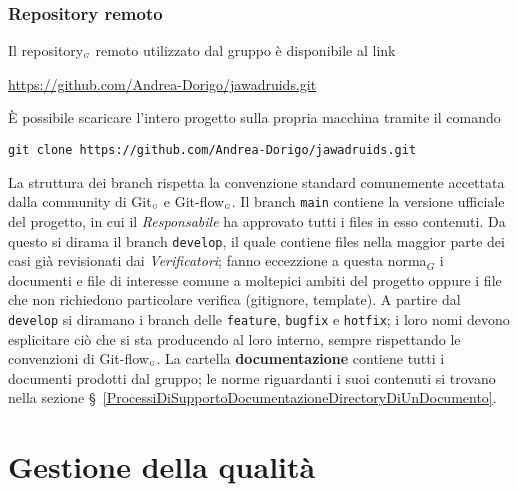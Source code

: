 \subsubsection{Repository remoto}\label{ProcessiDiSupportoGestioneDellaConfigurazioneVersionamentoRepositoryRemoto}
Il repository$_{\scaleto{G}{3pt}}$ remoto utilizzato dal gruppo è disponibile al link
\begin{center}
 \url{https://github.com/Andrea-Dorigo/jawadruids.git}
\end{center}
È possibile scaricare l'intero progetto sulla propria macchina tramite il comando
\begin{center}
  \texttt{git clone https://github.com/Andrea-Dorigo/jawadruids.git}
\end{center}
La struttura dei branch rispetta la convenzione standard comunemente accettata dalla community di Git$_{\scaleto{G}{3pt}}$ e Git-flow$_{\scaleto{G}{3pt}}$. %
Il branch \texttt{main} contiene la versione ufficiale del progetto, in cui il \textit{Responsabile} ha approvato tutti i files in esso contenuti.
Da questo si dirama il branch \texttt{develop}, il quale contiene files nella maggior parte dei casi già revisionati dai \textit{Verificatori}; fanno eccezzione a questa norma$_G$ i documenti e file di interesse comune a moltepici ambiti del progetto oppure i file che non richiedono particolare verifica (gitignore, template).
A partire dal \texttt{develop} si diramano i branch delle \texttt{feature}, \texttt{bugfix} e \texttt{hotfix}; i loro nomi devono esplicitare ciò che si sta producendo al loro interno, sempre rispettando le convenzioni di Git-flow$_{\scaleto{G}{3pt}}$.
La cartella \textbf{documentazione} contiene tutti i documenti prodotti dal gruppo; le norme riguardanti i suoi contenuti si trovano nella sezione \S~\ref{ProcessiDiSupportoDocumentazioneDirectoryDiUnDocumento}.
\section{Gestione della qualità} \label{ProcessiDiSupportoGestioneDellaQualità}
